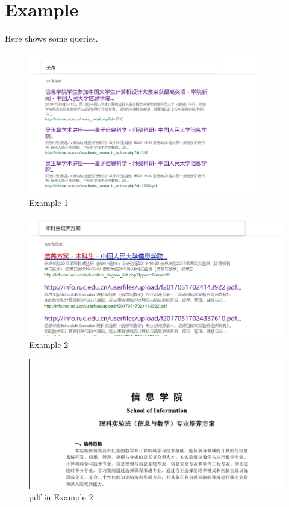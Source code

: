 \documentclass{article}
\begin{document}
\section{Example}
Here shows some queries.\\
\begin{figure}[h!]
\flushleft
\includegraphics[width=10cm]{wuhu.png}
\caption{Example 1}
\end{figure}
\begin{figure}[h!]
\flushleft
\includegraphics[width=12.5cm]{benkesheng.png}
\caption{Example 2}
\end{figure}
\begin{figure}[h!]
\flushleft
\includegraphics[width=12.5cm]{bks_detail.png}
\caption{pdf in Example 2}
\end{figure}
\end{document}
